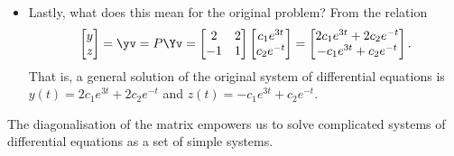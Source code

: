 \begin{itemize}
\item Lastly, what does this mean for the original problem?
From the relation
\begin{equation*}
\begin{bmatrix} y\\z \end{bmatrix}=\yv
=P\Yv=\begin{bmatrix} 2&2\\-1&1 \end{bmatrix}
\begin{bmatrix}c_1e^{3t}\\ c_2e^{-t} \end{bmatrix}
=\begin{bmatrix} 2c_1e^{3t}+2c_2e^{-t}
\\ -c_1e^{3t}+c_2e^{-t}\end{bmatrix}.
\end{equation*}
That is, a general solution of the original system of differential equations is \(y(t)=2c_1e^{3t}+2c_2e^{-t}\) and \(z(t)=-c_1e^{3t}+c_2e^{-t}\).

\end{itemize}
The diagonalisation of the matrix empowers us to solve complicated systems of differential equations as a set of simple systems.


